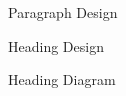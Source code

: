\documentclass{report}
\begin{document}
\lipsum[1-2]

\begin{center}
\paragraphvalues
\end{center}

\begin{figure}
\currentparagraph
\paragraphdiagram
\caption{Paragraph Design}
\end{figure}

\currentheading
{}

\begin{figure}
\headingdesign{\large\itshape}
\caption{Heading Design}
\end{figure}

\begin{figure}
\headingdiagram
\caption{Heading Diagram}
\end{figure}
\end{document}
